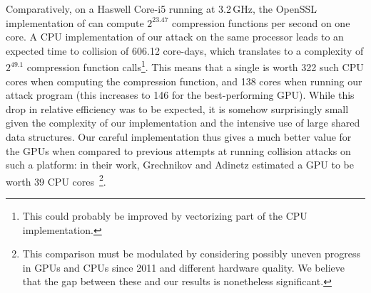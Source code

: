 Comparatively, on a Haswell Core-i5 running at 3.2\,GHz, the OpenSSL implementation of \shaone
can compute $2^{23.47}$ compression functions per second on one core. A CPU implementation of our attack
on the same processor leads to an expected time to collision of 606.12 core-days, which translates to a complexity of $2^{49.1}$
compression function calls\footnote{This could probably be improved by vectorizing part of the CPU implementation.}.
This means that a single \gtx is worth 322 such CPU cores when computing the \shaone compression function, and 138 cores when
running our attack program (this increases to 146 for the best-performing GPU).
While this drop in relative efficiency was to be expected, it is somehow surprisingly small given the
complexity of our implementation and \eg the intensive use of large shared data structures. Our careful implementation thus
gives a much better value for the GPUs when compared to previous attempts at running collision attacks on such a platform:
in their work, Grechnikov and Adinetz estimated a GPU to be worth 39 CPU cores~\cite{cryptoeprint:2011:641}\footnote{This comparison must be modulated by considering possibly uneven progress in GPUs and CPUs
since 2011 and different hardware quality. We believe that the gap between these and our results is nonetheless significant.}.
